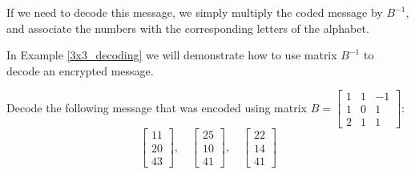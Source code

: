\begin{solution}
    If we need to decode this message, we simply multiply the coded message by \( B^{-1} \), and associate the numbers with the corresponding letters of the alphabet.

    In Example \ref{3x3_decoding} we will demonstrate how to use matrix \( B^{-1} \) to decode an encrypted message.
\end{solution}

\begin{example}\label{3x3_decoding}
    Decode the following message that was encoded using matrix \( B = \begin{bmatrix} 1 & 1 & -1 \\ 1 & 0 & 1 \\ 2 & 1 & 1 \end{bmatrix} \):
    \[
        \begin{bmatrix} 11 \\ 20 \\ 43 \end{bmatrix}, \quad
        \begin{bmatrix} 25 \\ 10 \\ 41 \end{bmatrix}, \quad
        \begin{bmatrix} 22 \\ 14 \\ 41 \end{bmatrix}
    \]
\end{example}

